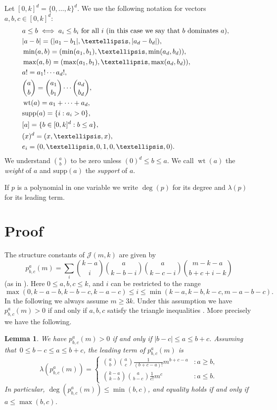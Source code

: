 \documentclass[10pt]{article}
\newtheorem{lemma}[theorem]{Lemma}
\newcommand{\cJ}{{\mathcal J}}
\newcommand{\lt}{\lambda}
\newcommand{\wt}{\operatorname{wt}}
\newcommand{\supp}{\mathrm{supp}}
\begin{document}
Let $[0,k]^d = \{0,\dots,k\}^d$.
We use the following notation for vectors $a,b,c \in [0,k]^d$:
\begin{align*}
    &a \leq b \iff a_i \leq b_i ~ \text{for all} ~ i ~ {(\text{in this case we say that } b ~ \text{\emph{dominates}} ~ a)}, &\\
    &|a - b| = (|a_1 - b_1|, \dots, |a_d - b_d|),\\
    &\min(a, b) = (\min(a_1, b_1), \dots, \min(a_d, b_d)),\\
    &\max(a, b) = (\max(a_1, b_1), \dots, \max(a_d, b_d)),\\
    &a! = a_1! \cdots a_d!,\\
    &\binom{a}{b} = \binom{a_1}{b_1} \cdots \binom{a_d}{b_d},\\
    &\wt(a) = a_1 + \cdots + a_d, \\
    &\supp(a) = \{ i : a_i > 0\}, \\
    &[a] = \{ b \in [0,k]^d : b \leq a\}, \\
    &(x)^d = (x, \dots, x), \\
    &e_i = (0, \dots, 0, 1, 0, \dots, 0).
\end{align*}
We understand $\binom{a}{b}$ to be zero unless $(0)^d \le b \le a$.
We call $\wt(a)$ the \emph{weight} of $a$ and $\supp(a)$ the \emph{support} of $a$.

If $p$ is a polynomial in one variable we write $\deg(p)$ for its degree and $\lt(p)$ for its leading term.

\section{Proof}

The structure constants of $\cJ(m,k)$ are given by
\[
    p_{b,c}^a(m) = \sum_{i} \binom{k-a}{i}\binom{a}{k-b-i}\binom{a}{k-c-i} \binom{m-k-a}{b+c+i-k}
\]
(as in \cite{E,KK}).
Here $0 \leq a, b, c \leq k$, and $i$ can be restricted to the range
\[
    \max(0,k-a-b,k-b-c,k-a-c) \leq i \leq \min(k-a,k-b,k-c, m-a-b-c).
\]
In the following we always assume $m \geq 3k$. Under this assumption we have $p_{b,c}^a(m) > 0$ if and only if $a,b,c$ satisfy the triangle inequalities \cite[Lemma~4.1]{E}.
More precisely we have the following.

\begin{lemma}
    We have $p^a_{b, c}(m) > 0$ if and only if $|b - c| \leq a \leq b + c$. 
    Assuming that~$0 \leq b - c \leq a \leq b + c$, the leading term of $p^a_{b,c}(m)$ is
    \[
        \lt(p_{b,c}^a(m)) = \begin{cases}
        \binom{a}{b}\binom{a}{c}\frac{1}{(b+c - a)!} m^{b+c-a} &: a \geq b,\\
        \binom{k-a}{k-b}\binom{a}{b-c}\frac{1}{c!} m^{c} &: a\leq b.
        \end{cases}
    \]
In particular, $\deg(p_{b,c}^a(m))\leq \min(b,c)$, and equality holds if and only if $a \leq \max(b,c)$.
\end{lemma}
\end{document}
